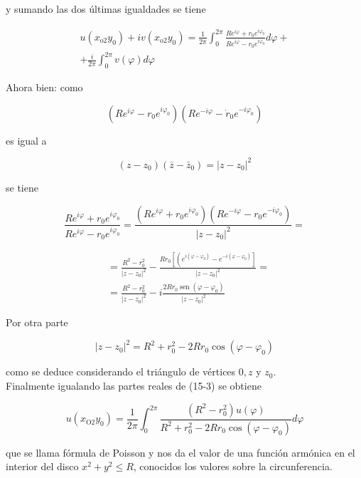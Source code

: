 \documentclass[10pt]{article}
\theoremstyle{plain}
\theoremstyle{definition}
\theoremstyle{remark}
\begin{document}
y sumando las dos últimas igualdades se tiene


\begin{gather*}
u\left(x_{\mathrm{o} 2} y_0\right)+i v\left(x_{\mathrm{o} 2} y_0\right)=\frac{1}{2 \pi} \int_{0}^{2 \pi} \frac{R e^{i \varphi}+r_0 e^{i \varphi_0}}{R e^{i \varphi}-r_0 e^{i \varphi_0}} d \varphi+ \\
+\frac{i}{2 \pi} \int_{0}^{2 \pi} v(\varphi) d \varphi \tag{$15\cdot3$}
\end{gather*}


Ahora bien: como

$$
\left(R e^{i \varphi}-r_{0} e^{i \varphi_{0}}\right)\left(R e^{-i \varphi}-\dot{r}_{0} e^{-i \varphi_{0}}\right)
$$

es igual a

$$
\left(z-z_{0}\right)\left(\bar{z}-\bar{z}_{0}\right)=\left|z-z_{0}\right|^{2}
$$

se tiene

$$
\frac{R e^{i \varphi}+r_{0} e^{i \varphi_{0}}}{R e^{i \varphi}-r_{0} e^{i \varphi_{0}}}=\frac{\left(R e^{i \varphi}+r_{0} e^{i \varphi_{0}}\right)\left(R e^{-i \varphi}-r_{0} e^{-i \varphi_{0}}\right)}{\left|z-z_{0}\right|^{2}}=
$$

$$
\begin{aligned}
& =\frac{R^{2}-r_{0}^{2}}{\left|z-z_{0}\right|^{2}}-\frac{R r_{0}\left[\left(e^{i\left(\varphi-\varphi_{0}\right)}-e^{-i\left(\varphi-\varphi_{0}\right)}\right]\right.}{\left|z-z_{0}\right|^{2}}= \\
& =\frac{R^{2}-r_{0}^{2}}{\left|z-z_{0}\right|^{2}}-i \frac{2 R r_{0} \operatorname{sen}\left(\varphi-\varphi_{0}\right)}{\left|z-z_{0}\right|^{2}}
\end{aligned}
$$

Por otra parte

$$
\left|z-z_{0}\right|^{2}=R^{2}+r_{0}^{2}-2 R r_{0} \cos \left(\varphi-\varphi_{0}\right)
$$

como se deduce considerando el triángulo de vértices $0, z$ y $z_{0}$.\\
Finalmente igualando las partes reales de (15-3) se obtiene


\begin{equation*}
u\left(x_{\mathrm{O} 2} y_0\right)=\frac{1}{2 \pi} \int_{0}^{2 \pi} \frac{\left(R^{2}-r_0^{2}\right) u(\varphi)}{R^{2}+r_{0}^{2}-2 R r_{0} \cos \left(\varphi-\varphi_{0}\right)} d \varphi \tag{15-4}
\end{equation*}


que se llama fórmula de Poisson y nos da el valor de una función armónica en el interior del disco $x^{2}+y^{2} \leqslant R$, conocidos los valores sobre la circunferencia.
\end{document}
